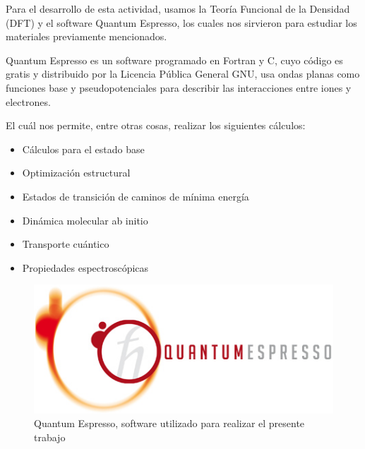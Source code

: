 
Para el desarrollo de esta actividad, usamos la Teoría Funcional de la Densidad (DFT)
y el software Quantum Espresso, los cuales nos sirvieron para estudiar los materiales
previamente mencionados.

Quantum Espresso es un software programado en Fortran y C, cuyo código es gratis y distribuido por la Licencia
Pública General GNU, usa ondas planas como funciones base y pseudopotenciales para describir las 
interacciones entre iones y electrones. \cite{WinNT}

\vspace{0.5cm}

El cuál nos permite, entre otras cosas, realizar los siguientes cálculos: \cite{WinNT}

\begin{itemize}
    \item Cálculos para el estado base
    \item Optimización estructural 
    \item Estados de transición de caminos de mínima energía
    \item Dinámica molecular ab initio
    \item Transporte cuántico
    \item Propiedades espectroscópicas
\end{itemize}

\vspace{1cm}

\begin{figure}[H]
    \centering
    \includegraphics[scale=0.5]{logo_header.jpg}
    \caption{Quantum Espresso, software utilizado para realizar el presente trabajo}
\end{figure}

\newpage